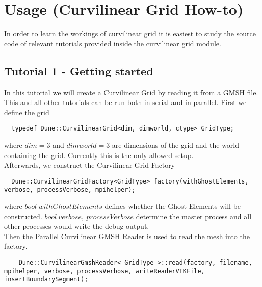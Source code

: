\section{Usage (Curvilinear Grid How-to)}
\label{usage-howto}

In order to learn the workings of curvilinear grid it is easiest to study the source code of relevant tutorials  provided inside the curvilinear grid module.

\subsection{Tutorial 1 - Getting started}
\label{usage-howto-tutorial-gettingstarted}

In this tutorial we will create a Curvilinear Grid by reading it from a GMSH file. This and all other tutorials can be run both in serial and in parallel.
First we define the grid \\

\begin{mybox}
\begin{lstlisting}
  typedef Dune::CurvilinearGrid<dim, dimworld, ctype> GridType;
\end{lstlisting}
\end{mybox}

\noindent
where $dim=3$ and $dimworld=3$ are dimensions of the grid and the world containing the grid. Currently this is the only allowed setup. \\

\noindent
Afterwards, we construct the Curvilinear Grid Factory \\

\begin{mybox}
\begin{lstlisting}
  Dune::CurvilinearGridFactory<GridType> factory(withGhostElements, verbose, processVerbose, mpihelper);
\end{lstlisting}
\end{mybox}

\noindent
where $bool\ withGhostElements$ defines whether the Ghost Elements will be constructed. $bool\ verbose,\ processVerbose$ determine the master process and all other processes would write the debug output. \\

\noindent
Then the Parallel Curvilinear GMSH Reader is used to read the mesh into the factory. \\

\begin{mybox}
\begin{lstlisting}
    Dune::CurvilinearGmshReader< GridType >::read(factory, filename, mpihelper, verbose, processVerbose, writeReaderVTKFile, insertBoundarySegment); 
\end{lstlisting}
\end{mybox}


